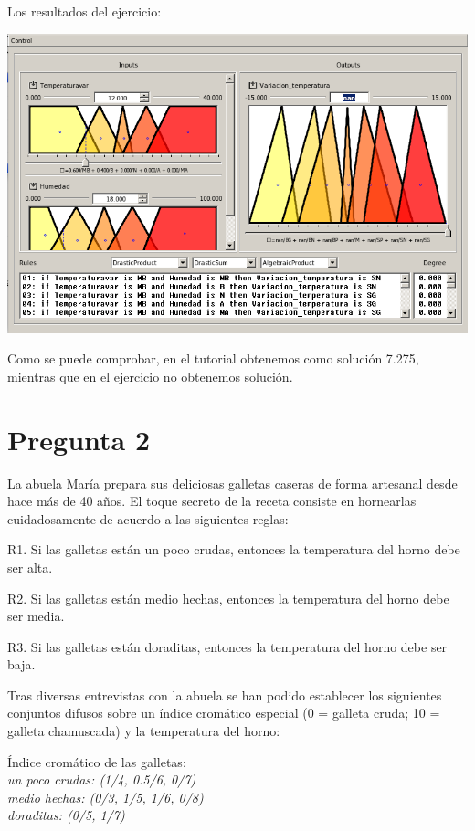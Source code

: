 \documentclass{article}
\newcommand\tab[1][1cm]{\hspace*{#1}}
\begin{document}
\newpage

Los resultados del ejercicio:

\begin{center}
\includegraphics[scale=0.5]{images/res2.png}
\end{center}

Como se puede comprobar, en el tutorial obtenemos como solución 7.275, mientras que en el ejercicio no obtenemos solución.

\section{Pregunta 2}

La abuela María prepara sus deliciosas galletas caseras de forma artesanal desde hace más de 40 años.
El toque secreto de la receta consiste en hornearlas cuidadosamente de acuerdo a las siguientes reglas:

R1. Si las galletas están un poco crudas, entonces la temperatura del horno debe ser alta.

R2. Si las galletas están medio hechas, entonces la temperatura del horno debe ser media.

R3. Si las galletas están doraditas, entonces la temperatura del horno debe ser baja.

Tras diversas entrevistas con la abuela se han podido establecer los siguientes conjuntos difusos sobre un índice cromático especial (0 = galleta cruda; 10 = galleta chamuscada) y la temperatura del horno:

Índice cromático de las galletas:\\
\tab \textit{un poco crudas: (1/4, 0.5/6, 0/7)} \\
\tab \textit{medio hechas: (0/3, 1/5, 1/6, 0/8)} \\
\tab \textit{doraditas: (0/5, 1/7)} 
\end{document}
